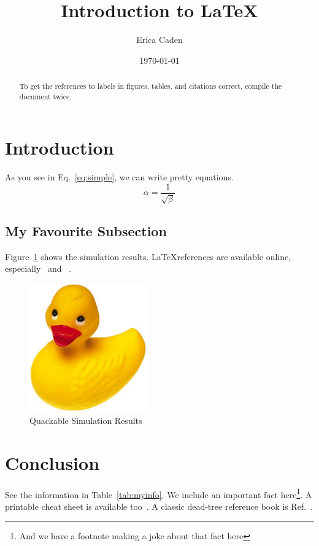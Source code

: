 \documentclass[11pt]{article}
\begin{document}
\title{Introduction to \LaTeX{}}
\author{Erica Caden}
\date{\today}

\maketitle

\begin{abstract}
To get the references to labels in figures, tables, and citations correct, compile the document twice. 
\end{abstract}

\section{Introduction}
As you see in Eq.~\ref{eq:simple}, we can write pretty equations.\begin{equation}
    \label{eq:simple}
    \alpha = \frac{1}{\sqrt{\beta}}
\end{equation}

\subsection{My Favourite Subsection}
Figure~\ref{fig:myfigure} shows the simulation results.  \LaTeX references are available online, especially~\cite{wikibooks} and ~\cite{stackexchange}.
\begin{figure}[htbp]
    \centering
    \includegraphics[width=2.0in]{duck.png}
    \caption{Quackable Simulation Results}
    \label{fig:myfigure}
\end{figure}

\section{Conclusion}
See the information in Table~\ref{tab:myinfo}. We include an important fact here\footnote{And we have a footnote making a joke about that fact here}.  A printable cheat sheet is available too~\cite{cheatsheet}.  A classic dead-tree reference book is Ref.~\cite{lamport94}.
\end{document}
